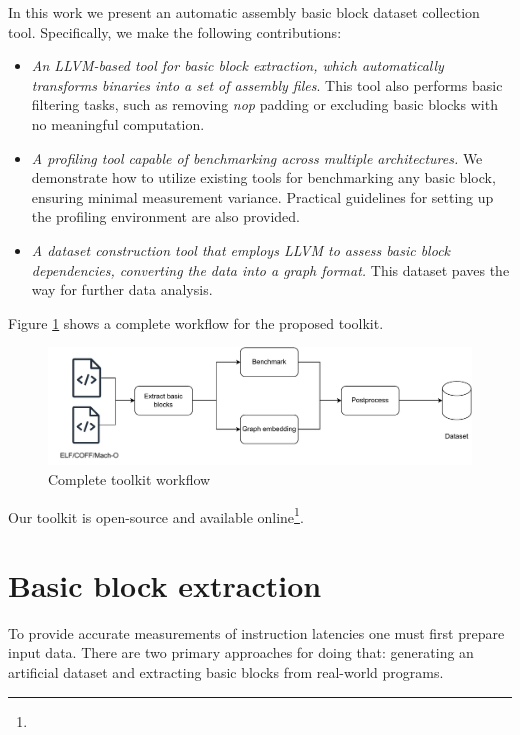 In this work we present an automatic assembly basic block dataset collection tool. Specifically, we make 
the following contributions:
\begin{itemize}
  \item \textit{An LLVM-based tool for basic block extraction, which automatically transforms binaries into a set 
        of assembly files}. This tool also performs basic filtering tasks, such as removing \textit{nop} 
        padding or excluding basic blocks with no meaningful computation.
  \item \textit{A profiling tool capable of benchmarking across multiple architectures.} We demonstrate how to utilize
        existing tools for benchmarking any basic block, ensuring minimal measurement variance. Practical 
        guidelines for setting up the profiling environment are also provided.
  \item \textit{A dataset construction tool that employs LLVM to assess basic block dependencies, converting the 
        data into a graph format.} This dataset paves the way for further data analysis.
\end{itemize}

Figure \ref{fig:workflow} shows a complete workflow for the proposed toolkit.

\begin{figure}[h]
  \centering
  \includegraphics[width=0.8\linewidth]{workflow}
  \caption{Complete toolkit workflow}
  \label{fig:workflow}
\end{figure}

Our toolkit is open-source and available online\footnote{}.

\section{Basic block extraction}

To provide accurate measurements of instruction latencies one must first prepare input data. There are 
two primary approaches for doing that: generating an artificial dataset and extracting basic blocks from
real-world programs.

